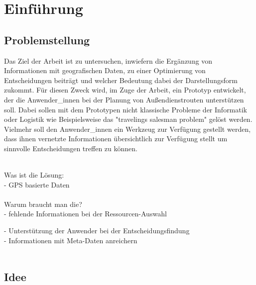 \documentclass[Bachelorarbeit.tex]{subfiles}
\begin{document}
\chapter{Einführung}
\label{chap:einfuehrung}

\section{Problemstellung}
\label{chap:einfuehrung:sec:problemstellung}

Das Ziel der Arbeit ist zu untersuchen, 
inwiefern die Ergänzung  von Informationen mit geografischen Daten, 
zu einer Optimierung von Entscheidungen beiträgt und welcher Bedeutung dabei der Darstellungsform zukommt. 
Für diesen Zweck wird, im Zuge der Arbeit, ein Prototyp entwickelt, der die Anwender\_innen bei der Planung von Außendienstrouten unterstützen soll. 
Dabei sollen mit dem Prototypen nicht klassische Probleme der Informatik oder Logistik wie Beispielsweise das "travelings salesman problem" gelöst werden. Vielmehr soll den Anwender\_innen ein Werkzeug zur Verfügung gestellt werden, dass ihnen vernetzte Informationen übersichtlich zur Verfügung stellt um sinnvolle Entscheidungen treffen zu können.\\
\\

\begin{comment}
Als Grundlage für den Prototypen dient die Software Pery der Firma Perfany GmbH. 
Dabei handelt es sich um 
Wobei der Fokus auf dem Ticket Modul der Software ruht. Dabei ist das Anwendungskonzept des Moduls so ausgelegt das sämtliche Aufgaben, die die Firma betreffen , einzeln als Tickets erfasst werden. 
\end{comment}


Was ist die Lösung:\\
- GPS basierte Daten\\
\\
Warum braucht man die?\\
- fehlende Informationen bei der Ressourcen-Auswahl

- Unterstützung der Anwender bei der Entscheidungsfindung \\
- Informationen mit Meta-Daten anreichern\\
\\


\section{Idee}
\label{chap:einfuehrung:sec:idee}
\end{document}
